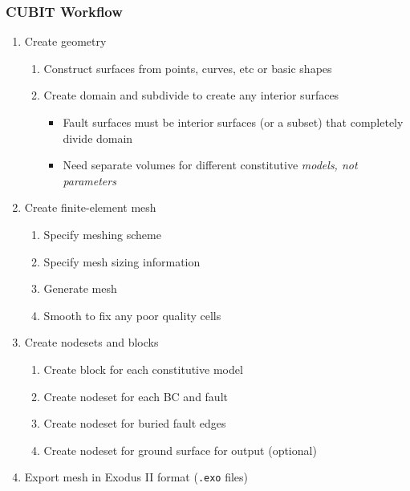 \documentclass{beamer}
\newcommand{\important}[1]{{\color{red}#1}}
\begin{document}
\begin{frame}
  \frametitle{CUBIT Workflow}
  \summary{}
 
  \begin{enumerate}
  \item Create geometry
    \begin{enumerate}
    \item Construct surfaces from points, curves, etc or basic shapes
    \item Create domain and subdivide to create any interior surfaces
      \begin{itemize}
      \item Fault surfaces must be interior surfaces (or a subset) that completely divide domain
      \item Need separate volumes for different constitutive {\em models, not parameters}
      \end{itemize}
    \end{enumerate}
  \item Create finite-element mesh
    \begin{enumerate}
    \item Specify meshing scheme
    \item Specify mesh sizing information
    \item Generate mesh
    \item Smooth to fix any poor quality cells
    \end{enumerate}
  \item Create nodesets and blocks
    \begin{enumerate}
    \item Create block for each constitutive model
    \item Create nodeset for each BC and fault
    \item \important{Create nodeset for buried fault edges}
    \item Create nodeset for ground surface for output (optional)
    \end{enumerate}
  \item Export mesh in Exodus II format ({\tt .exo} files)
  \end{enumerate}

\end{frame}
\end{document}
